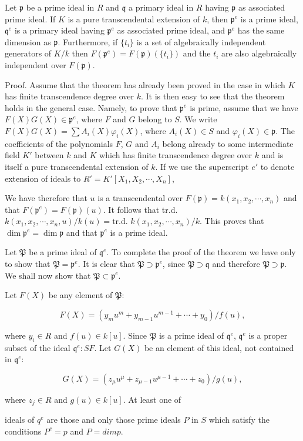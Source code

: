 Let $\mathfrak{p}$ be a prime ideal in $R$ and $\mathfrak{q}$ a primary ideal in $R$ having $\mathfrak{p}$ as associated prime ideal. If $K$ is a pure transcendental extension of $k$, then $\mathfrak{p}^e$ is a prime ideal, $\mathfrak{q}^e$ is a primary ideal having $\mathfrak{p}^e$ as associated prime ideal, and $\mathfrak{p}^e$ has the same dimension as $\mathfrak{p}$. Furthermore, if $\{t_i\}$ is a set of algebraically independent generators of $K/k$ then $F(\mathfrak{p}^e) = F(\mathfrak{p})(\{t_i\})$ and the $t_i$ are also algebraically independent over $F(\mathfrak{p})$.

Proof. Assume that the theorem has already been proved in the case in which $K$ has finite transcendence degree over $k$. It is then easy to see that the theorem holds in the general case. Namely, to prove that $\mathfrak{p}^e$ is prime, assume that we have $F(X)G(X) \in \mathfrak{p}^e$, where $F$ and $G$ belong to $S$. We write $F(X)G(X) = \sum A_i(X)\varphi_i(X)$, where $A_i(X) \in S$ and $\varphi_i(X) \in \mathfrak{p}$. The coefficients of the polynomials $F$, $G$ and $A_i$ belong already to some intermediate field $K'$ between $k$ and $K$ which has finite transcendence degree over $k$ and is itself a pure transcendental extension of $k$. If we use the superscript $e'$ to denote extension of ideals to $R' = K'[X_1, X_2, \cdots, X_n]$,

We have therefore that $u$ is a transcendental over $F(\mathfrak{p}) = k(x_1, x_2, \cdots, x_n)$ and that $F(\mathfrak{p}^e) = F(\mathfrak{p})(u)$. It follows that tr.d. $k(x_1, x_2, \cdots, x_n, u)/k(u) = \text{tr.d. } k(x_1, x_2, \cdots, x_n)/k$. This proves that $\dim \mathfrak{p}^e = \dim \mathfrak{p}$ and that $\mathfrak{p}^e$ is a prime ideal.

Let $\mathfrak{P}$ be a prime ideal of $\mathfrak{q}^e$. To complete the proof of the theorem we have only to show that $\mathfrak{P} = \mathfrak{p}^e$. It is clear that $\mathfrak{P} \supset \mathfrak{p}^e$, since $\mathfrak{P} \supset \mathfrak{q}$ and therefore $\mathfrak{P} \supset \mathfrak{p}$. We shall now show that $\mathfrak{P} \subset \mathfrak{p}^e$.

Let $F(X)$ be any element of $\mathfrak{P}$:

$$F(X) = (y_m u^m + y_{m-1} u^{m-1} + \cdots + y_0)/f(u),$$

where $y_i \in R$ and $f(u) \in k[u]$. Since $\mathfrak{P}$ is a prime ideal of $\mathfrak{q}^e$, $\mathfrak{q}^e$ is a proper subset of the ideal $\mathfrak{q}^e: SF$. Let $G(X)$ be an element of this ideal, not contained in $\mathfrak{q}^e$:

$$G(X) = (z_\mu u^\mu + z_{\mu-1} u^{\mu-1} + \cdots + z_0)/g(u),$$

where $z_j \in R$ and $g(u) \in k[u]$. At least one of

ideals of $q^e$ are those and only those prime ideals $P$ in $S$ which satisfy the conditions $P^c = p$ and $P = dim p$.